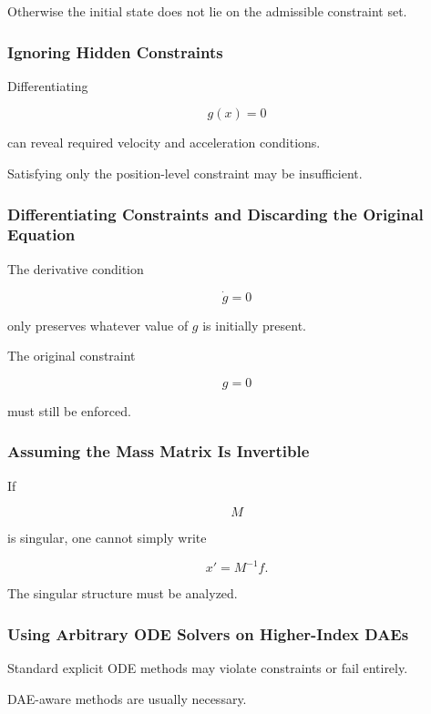 Otherwise the initial state does not lie on the admissible constraint
set.

\subsubsection{Ignoring Hidden Constraints}

Differentiating

\[
g(x)=0
\]

can reveal required velocity and acceleration conditions.

Satisfying only the position-level constraint may be insufficient.

\subsubsection{Differentiating Constraints and Discarding the Original Equation}

The derivative condition

\[
\dot g=0
\]

only preserves whatever value of \(g\) is initially present.

The original constraint

\[
g=0
\]

must still be enforced.

\subsubsection{Assuming the Mass Matrix Is Invertible}

If

\[
M
\]

is singular, one cannot simply write

\[
x'=M^{-1}f.
\]

The singular structure must be analyzed.

\subsubsection{Using Arbitrary ODE Solvers on Higher-Index DAEs}

Standard explicit ODE methods may violate constraints or fail entirely.

DAE-aware methods are usually necessary.

